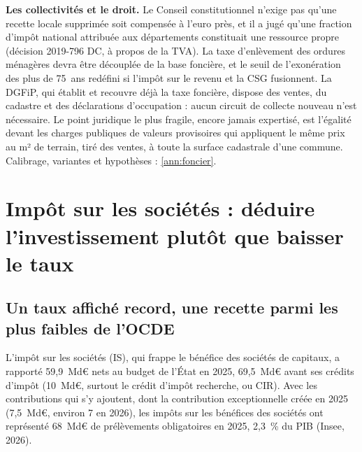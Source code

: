 \documentclass[11pt,a4paper]{article}
\begin{document}
\textbf{Les collectivités et le droit.} Le Conseil constitutionnel
n'exige pas qu'une recette locale supprimée soit compensée à l'euro près, et il a jugé qu'une fraction d'impôt national
attribuée aux départements constituait une ressource propre (décision 2019-796 DC, à propos de la TVA). La taxe
d'enlèvement des ordures ménagères devra être découplée de la base foncière, et le seuil de l'exonération des plus de
75~ans redéfini si l'impôt sur le revenu et la CSG fusionnent. La DGFiP, qui établit et recouvre déjà la taxe foncière,
dispose des ventes, du cadastre et des déclarations d'occupation : aucun circuit de collecte nouveau n'est nécessaire.
Le point juridique le plus fragile, encore jamais expertisé, est l'égalité devant les charges publiques de valeurs
provisoires qui appliquent le même prix au m² de terrain, tiré des ventes, à toute la surface cadastrale d'une commune. Calibrage, variantes et hypothèses : \ref{ann:foncier}.


\section{Impôt sur les sociétés : déduire l'investissement plutôt que baisser le taux}\label{sec:is}

\subsection{Un taux affiché record, une recette parmi les plus faibles de l'OCDE}\label{sec:is_situation}

L'impôt sur les sociétés (IS), qui frappe le bénéfice des sociétés de capitaux, a rapporté 59,9~Md€ nets au budget
de l'État en 2025, 69,5~Md€ avant ses crédits d'impôt (10~Md€, surtout le crédit d'impôt recherche, ou CIR). Avec les contributions qui s'y ajoutent,
dont la contribution exceptionnelle créée en 2025 (7,5~Md€, environ 7 en 2026), les impôts sur les bénéfices des
sociétés ont représenté 68~Md€ de prélèvements obligatoires en 2025, 2,3~\% du PIB (Insee, 2026).
\end{document}
